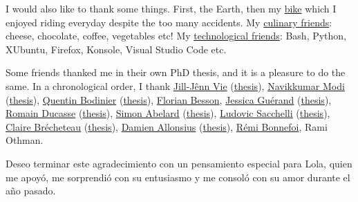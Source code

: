 \begin{acknowledgements}
I would also like to thank some things. First, the Earth, then my \href{https://perso.crans.org/besson/zero-dechet/}{bike} which I enjoyed riding everyday despite the too many accidents.
My \href{https://perso.crans.org/besson/cuisine/}{culinary friends}: cheese, chocolate, coffee, vegetables etc!
My \href{https://perso.crans.org/besson/}{technological friends}: Bash, Python, XUbuntu, Firefox, Konsole, Visual Studio Code etc.


Some friends thanked me in their own PhD thesis, and it is a pleasure to do the same.
In a chronological order, I thank
\href{http://jill-jenn.net/}{Jill-Jênn Vie} (\href{http://jiji.cat/cat.pdf}{thesis}), \href{https://navikkumarmodi.wordpress.com/}{Navikkumar Modi} (\href{https://tel.archives-ouvertes.fr/tel-01668536/document}{thesis}), \href{https://quentinbodinier.wordpress.com/}{Quentin Bodinier} (\href{https://tel.archives-ouvertes.fr/tel-01731022/document}{thesis}), \href{https://paris-sorbonne.academia.edu/FBesson}{Florian Besson}, \href{https://sites.google.com/view/guerand}{Jessica Guérand} (\href{https://drive.google.com/open?id=17CBibM8ZlzIbyVxpxktK3j5rNePALUs8}{thesis}), \href{https://sites.google.com/view/ducasse/}{Romain Ducasse} (\href{https://drive.google.com/open?id=1u2oxRRimcO0jQfuYwSVwgKfcHU5DdoPK}{thesis}), \href{https://members.loria.fr/SAbelard/}{Simon Abelard} (\href{https://members.loria.fr/SAbelard/theseabelard.pdf}{thesis}), \href{http://www.cmap.polytechnique.fr/~sacchelli/}{Ludovic Sacchelli} (\href{https://tel.archives-ouvertes.fr/tel-01893068/document}{thesis}), \href{http://pages.saclay.inria.fr/claire.brecheteau/}{Claire Brécheteau} (\href{https://hal.archives-ouvertes.fr/tel-01897787/document}{thesis}), \href{http://www.i2m.univ-amu.fr/perso/damien.allonsius/}{Damien Allonsius} (\href{http://www.i2m.univ-amu.fr/perso/damien.allonsius/documents/recherche/these/Main.pdf}{thesis}), \href{https://remibonnefoi.wordpress.com/}{Rémi Bonnefoi}, Rami Othman.

Deseo terminar este agradecimiento con un pensamiento especial para Lola, quien me apoyó, me sorprendió con su entusiasmo y me consoló con su amor durante el año pasado.
\textcolor{white}{Yo te quiero gatita, ¡impresivo!}

\end{acknowledgements}
